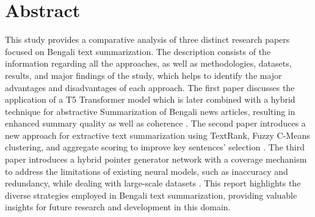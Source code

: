 \documentclass[12pt]{report}
\begin{document}
\section*{\centering Abstract}
This study provides a comparative analysis of three distinct research papers focused on Bengali text summarization. The description consists of the information regarding all the approaches, as well as methodologies, datasets, results, and major findings of the study, which helps to identify the major advantages and disadvantages of each approach. The first paper discusses the application of a T5 Transformer model which is later combined with a hybrid technique for abstractive Summarization of Bengali news articles, resulting in enhanced summary quality as well as coherence \cite{hasib2023bengali}. The second paper introduces a new approach for extractive text summarization using TextRank, Fuzzy C-Means clustering, and aggregate scoring to improve key sentences’ selection \cite{rahman2019bengali}. The third paper introduces a hybrid pointer generator network with a coverage mechanism to address the limitations of existing neural models, such as inaccuracy and redundancy, while dealing with large-scale datasets \cite{dhar2021pointer}. This report highlights the diverse strategies employed in Bengali text summarization, providing valuable insights for future research and development in this domain.

\newpage

\end{document}
